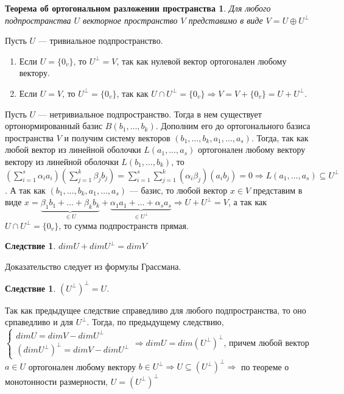 \newtheorem*{th14_4_2}{Теорема об ортогональном разложении пространства}\begin{th14_4_2}
	Для любого подпространства $U$ векторное пространство $V$ представимо в виде $V= U \oplus U^{\perp}$
\end{th14_4_2}\begin{Proof} Пусть $U$ --- тривиальное подпространство.\begin{enumerate}
		\item Если $U = \{0_v\}$, то $U^\perp = V$, так как нулевой вектор ортогонален любому вектору.
		\item Если $U = V$, то $U^\perp = \{0_v\}$, так как $U\cap U^\perp = \{0_v\}\Rightarrow V = V + \{0_v\} = U + U^{\perp}$.
	\end{enumerate}
	Пусть $U$ --- нетривиальное подпространство. Тогда в нем существует ортонормированный базис  $B(b_1,\dots,b_k)$. Дополним его до ортогонального базиса пространства $V$ и получим систему векторов $(b_1,\dots,b_k, a_1,\dots,a_s)$. Тогда, так как любой вектор из линейной оболочки $L(a_1,\dots,a_s)$ ортогонален любому вектору вектору из линейной оболочки $L(b_1,\dots,b_k)$, то $(\sum\limits_{i=1}^s\alpha_ia_i)(\sum\limits_{j=1}^k\beta_jb_j) = \sum\limits_{i=1}^s\sum\limits_{j=1}^k(\alpha_i\beta_j)(a_ib_j) = 0\Rightarrow L(a_1,\dots,a_s)\subseteq U^\perp$. А так как $(b_1,\dots,b_k,a_1,\dots,a_s)$ --- базис, то любой вектор $x \in V$ представим в виде $x = \underbrace{\beta_1b_1 + \ldots + \beta_k b_k}_{\in U} +\underbrace{ \alpha_1 a_1 + \ldots + \alpha_s a_s}_{\in U^\perp} \Rightarrow U + U^\perp = V$, а так как $U\cap U^\perp = \{0_v\}$, то сумма подпространств прямая.
\end{Proof}
\newtheorem*{cor14_4_1}{Следствие}\begin{cor14_4_1}$dim U+dim U^{\perp}= dim V$
\end{cor14_4_1}
\begin{Proof}
	Доказательство следует из формулы Грассмана.
\end{Proof}
\newtheorem*{cor14_4_2}{Следствие}\begin{cor14_4_2}$(U^{\perp})^{\perp}=U$.
\end{cor14_4_2}\begin{Proof} Так как предыдущее следствие справедливо для любого подпространства, то оно српаведливо и для $U^\perp$. Тогда, по предыдущему следствию,
	$\begin{cases}
		dim U = dim V - dim U^\perp\\
		(dim U^\perp)^\perp = dimV - dim U^\perp
	\end{cases}\Rightarrow dim U = dim (U^\perp)^\perp$, причем любой вектор $a \in U$ ортогонален любому вектору $b \in U^\perp\Rightarrow U\subseteq (U^\perp)^\perp\Rightarrow$ по теореме о монотонности размерности, $U = (U^\perp)^\perp$
\end{Proof}\\\\
